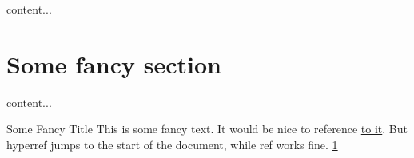 \documentclass{beamer}
\begin{document}
\begin{frame}
content...
\end{frame}

\section{Some fancy section}
\label{sec:section}

\begin{frame}
content...
\end{frame}

\begin{frame}{Some Fancy Title}
This is some fancy text. It would be nice to reference \hyperlink{sec:section}{to it}. But hyperref jumps to the start of the document, while ref works fine. \ref{sec:section}   


  
\end{frame}
\end{document}
